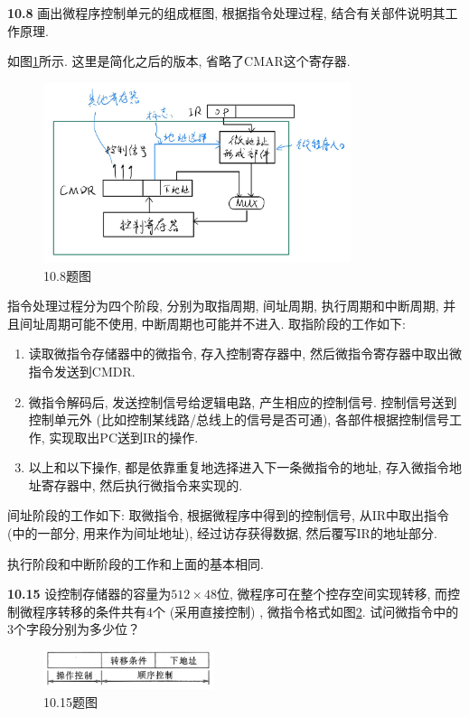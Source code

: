 \documentclass[UTF8]{report}
\newcommand{\problem}[1]{{\setlength{\parskip}{10pt}\noindent \bf{#1}}}
\newenvironment{solution}{{\noindent\hskip 2em \bf 解 \quad}}{}
\begin{document}
\problem{10.8} 画出微程序控制单元的组成框图, 根据指令处理过程, 结合有关部件说明其工作原理. 

\begin{solution}
    如图\ref{fig:10_8}所示. 这里是简化之后的版本, 省略了CMAR这个寄存器.
    \begin{figure}[!htbp]
        \centering
        \includegraphics[width=9cm]{fig/10.8.png}
        \caption{10.8题图}
        \label{fig:10_8}
    \end{figure}

    指令处理过程分为四个阶段, 分别为取指周期, 间址周期, 执行周期和中断周期, 并且间址周期可能不使用, 中断周期也可能并不进入. 取指阶段的工作如下:

    \begin{enumerate}
        \item 读取微指令存储器中的微指令, 存入控制寄存器中, 然后微指令寄存器中取出微指令发送到CMDR.
        \item 微指令解码后, 发送控制信号给逻辑电路, 产生相应的控制信号. 控制信号送到控制单元外 (比如控制某线路/总线上的信号是否可通), 各部件根据控制信号工作, 实现取出PC送到IR的操作.
        \item 以上和以下操作, 都是依靠重复地选择进入下一条微指令的地址, 存入微指令地址寄存器中, 然后执行微指令来实现的.
    \end{enumerate}

    间址阶段的工作如下: 取微指令, 根据微程序中得到的控制信号, 从IR中取出指令 (中的一部分, 用来作为间址地址), 经过访存获得数据, 然后覆写IR的地址部分.

    执行阶段和中断阶段的工作和上面的基本相同.
\end{solution}


\problem{10.15} 设控制存储器的容量为$512 \times 48$位, 微程序可在整个控存空间实现转移, 而控制微程序转移的条件共有$4$个 (采用直接控制) , 微指令格式如图\ref{fig:10_15}. 试问微指令中的$3$个字段分别为多少位？
\begin{figure}[!htbp]
    \centering
    \includegraphics[width=5cm]{fig/10.15.png}
    \caption{10.15题图}
    \label{fig:10_15}
\end{figure}
\end{document}
